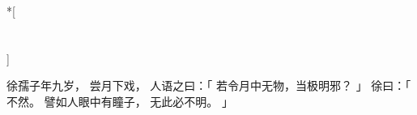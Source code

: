 
\switchcolumn[0]*[\section{}]

徐孺子年九岁，
尝月下戏，
人语之曰：「
    若令月中无物，当极明邪？
」
徐曰：「
    不然。
    譬如人眼中有瞳子，
    无此必不明。
」

\switchcolumn



